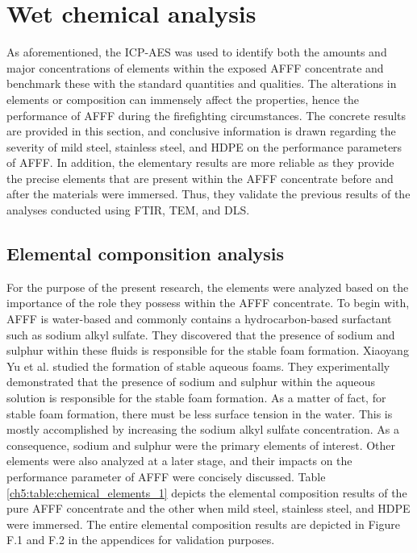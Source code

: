 \section{Wet chemical analysis}
As aforementioned, the ICP-AES was used to identify both the amounts and major concentrations of elements within the exposed AFFF concentrate and benchmark these with the standard quantities and qualities. The alterations in elements or composition can immensely affect the properties, hence the performance of AFFF during the firefighting circumstances. The concrete results are provided in this section, and conclusive information is drawn regarding the severity of mild steel, stainless steel, and HDPE on the performance parameters of AFFF. In addition, the elementary results are more reliable as they provide the precise elements that are present within the AFFF concentrate before and after the materials were immersed. Thus, they validate the previous results of the analyses conducted using FTIR, TEM, and DLS.

\subsection{Elemental componsition analysis}
For the purpose of the present research, the elements were analyzed based on the importance of the role they possess within the AFFF concentrate. To begin with, AFFF is water-based and commonly contains a hydrocarbon-based surfactant such as sodium alkyl sulfate. They discovered that the presence of sodium and sulphur within these fluids is responsible for the stable foam formation. Xiaoyang Yu et al. \cite{yu2020formation} studied the formation of stable aqueous foams. They experimentally demonstrated that the presence of sodium and sulphur within the aqueous solution is responsible for the stable foam formation. As a matter of fact, for stable foam formation, there must be less surface tension in the water. This is mostly accomplished by increasing the sodium alkyl sulfate concentration. As a consequence, sodium and sulphur were the primary elements of interest. Other elements were also analyzed at a later stage, and their impacts on the performance parameter of AFFF were concisely discussed. Table \ref{ch5:table:chemical_elements_1} depicts the elemental composition results of the pure AFFF concentrate and the other when mild steel, stainless steel, and HDPE were immersed. The entire elemental composition results are depicted in Figure F.1 and F.2 in the appendices for validation purposes.

